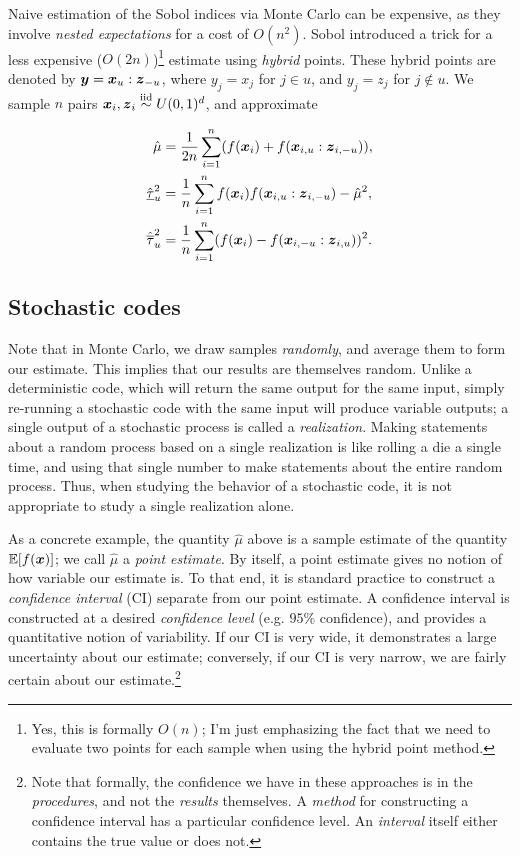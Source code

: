\documentclass[../primer.tex]{subfiles}
\begin{document}
Naive estimation of the Sobol indices via Monte Carlo can be expensive, as they
involve \emph{nested expectations} for a cost of \(O(n^2)\). Sobol \cite{sobol1993}
introduced a trick for a less expensive (\(O(2n)\))\footnote{Yes, this is formally
\(O(n)\); I'm just emphasizing the fact that we need to evaluate two points for
each sample when using the hybrid point method.} estimate using \emph{hybrid} points.
These hybrid points are denoted by \(\boldsymbol{y}=\boldsymbol{x}_u:\boldsymbol{z}_{-u}\), where \(y_j=x_j\) for
\(j\in u\), and \(y_j=z_j\) for \(j\not\in u\). We sample \(n\) pairs
\(\boldsymbol{x}_i,\boldsymbol{z}_i\overset{\text{iid}}{\sim} U(0,1)^d\), and approximate

\begin{equation}\begin{aligned}
  \hat{\mu} &= \frac{1}{2n}\sum_{i=1}^n(f(\boldsymbol{x}_i)+f(\boldsymbol{x}_{i,u}:\boldsymbol{z}_{i,-u})), \\
  \hat{\underline{\tau}}_u^2 &= \frac{1}{n}\sum_{i=1}^n f(\boldsymbol{x}_i)f(\boldsymbol{x}_{i,u}:\boldsymbol{z}_{i,-u})-\hat{\mu}^2, \\
  \hat{\overline{\tau}}_u^2 &= \frac{1}{n}\sum_{i=1}^n(f(\boldsymbol{x}_i)-f(\boldsymbol{x}_{i,-u}:\boldsymbol{z}_{i,u}))^2.
\end{aligned}\end{equation}

\subsection{Stochastic codes}
\label{sec:org1e064c1}
Note that in Monte Carlo, we draw samples \emph{randomly}, and average them to form
our estimate. This implies that our results are themselves random. Unlike a
deterministic code, which will return the same output for the same input, simply
re-running a stochastic code with the same input will produce variable outputs;
a single output of a stochastic process is called a \emph{realization}. Making
statements about a random process based on a single realization is like rolling
a die a single time, and using that single number to make statements about the
entire random process. Thus, when studying the behavior of a stochastic code, it
is not appropriate to study a single realization alone.

As a concrete example, the quantity \(\hat{\mu}\) above is a sample estimate of
the quantity \(\mathbb{E}[f(\boldsymbol{x})]\); we call \(\hat{\mu}\) a \emph{point estimate}. By itself, a
point estimate gives no notion of how variable our estimate is. To that end, it
is standard practice to construct a \emph{confidence interval} (CI) separate from our
point estimate. A confidence interval is constructed at a desired \emph{confidence
level} (e.g. \(95\%\) confidence), and provides a quantitative notion of
variability. If our CI is very wide, it demonstrates a large uncertainty about
our estimate; conversely, if our CI is very narrow, we are fairly certain about
our estimate.\footnote{Note that formally, the confidence we have in these approaches
is in the \emph{procedures}, and not the \emph{results} themselves. A \emph{method} for
constructing a confidence interval has a particular confidence level. An
\emph{interval} itself either contains the true value or does not.}
\end{document}
